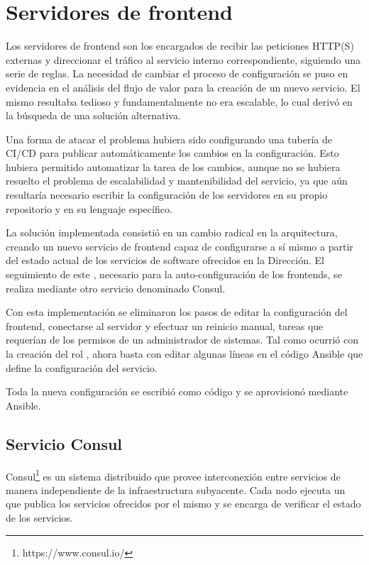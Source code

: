 \section{Servidores de frontend}

Los servidores de frontend son los encargados de recibir las
peticiones HTTP(S) externas y direccionar el tráfico al servicio
interno correspondiente, siguiendo una serie de reglas. La necesidad
de cambiar el proceso de configuración se puso en evidencia en el
análisis del flujo de valor para la creación de un nuevo servicio. El
mismo resultaba tedioso y fundamentalmente no era escalable, lo cual
derivó en la búsqueda de una solución alternativa.

Una forma de atacar el problema hubiera sido configurando una tubería
de CI/CD para publicar automáticamente los cambios en la
configuración. Esto hubiera permitido automatizar la tarea de
 los cambios, aunque no se hubiera resuelto el
problema de escalabilidad y mantenibilidad del servicio, ya que aún
resultaría necesario escribir la configuración de los servidores en su
propio repositorio y en su lenguaje específico.

La solución implementada consistió en un cambio radical en la
arquitectura, creando un nuevo servicio de frontend capaz de
configurarse a sí mismo a partir del estado actual de los servicios de
software ofrecidos en la Dirección. El seguimiento de este
, necesario para la auto-configuración de los
frontends, se realiza mediante otro servicio denominado Consul.

Con esta implementación se eliminaron los pasos de editar la
configuración del frontend, conectarse al servidor y efectuar un
reinicio manual, tareas que requerían de los permisos de un
administrador de sistemas. Tal como ocurrió con la creación del rol
, ahora basta con editar algunas líneas en el código
Ansible que define la configuración del servicio.

Toda la nueva configuración se escribió como código y se aprovisionó
mediante Ansible.

\subsection{Servicio Consul}

Consul\footnote{ https://www.consul.io/} es un sistema distribuido que
provee interconexión entre servicios de manera independiente de la
infraestructura subyacente. Cada nodo ejecuta un  que
publica los servicios ofrecidos por el mismo y se encarga de verificar
el estado de los servicios.

